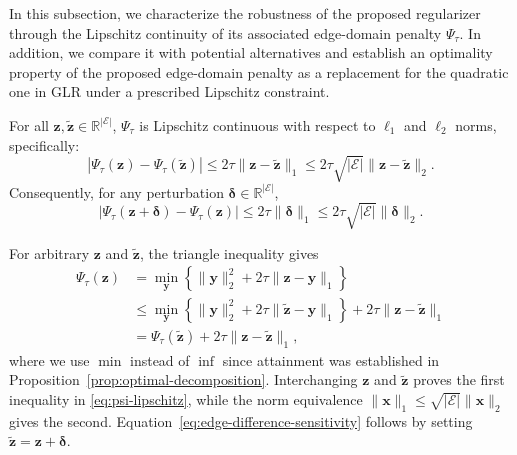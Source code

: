 In this subsection, we characterize the robustness of the proposed regularizer through the Lipschitz continuity of its associated edge-domain penalty $\Psi_{\tau}$.
In addition, we compare it with potential alternatives and establish an optimality property of the proposed edge-domain penalty as a replacement for the quadratic one in GLR under a prescribed Lipschitz constraint.

\begin{proposition}
\label{prop:edge-difference-sensitivity}
For all $\mathbf{z},\widetilde{\mathbf{z}}\in\mathbb{R}^{|\mathcal{E}|}$, $\Psi_{\tau}$ is Lipschitz continuous with respect to $\ell_1$ and $\ell_2$ norms, specifically:
\begin{equation}
\left|
\Psi_{\tau}(\mathbf{z})
-
\Psi_{\tau}(\widetilde{\mathbf{z}})
\right|
\leq
2\tau\|\mathbf{z}-\widetilde{\mathbf{z}}\|_1
\leq
2\tau\sqrt{|\mathcal{E}|}\|\mathbf{z}-\widetilde{\mathbf{z}}\|_2.
\label{eq:psi-lipschitz}
\end{equation}
Consequently, for any perturbation $\boldsymbol{\delta}\in\mathbb{R}^{|\mathcal{E}|}$,
\begin{equation}
\left|
\Psi_{\tau}(\mathbf{z}+\boldsymbol{\delta})
-
\Psi_{\tau}(\mathbf{z})
\right|
\leq
2\tau\|\boldsymbol{\delta}\|_1
\leq
2\tau\sqrt{|\mathcal{E}|}\|\boldsymbol{\delta}\|_2.
\label{eq:edge-difference-sensitivity}
\end{equation}
\end{proposition}

\begin{IEEEproof}
For arbitrary $\mathbf{z}$ and $\widetilde{\mathbf{z}}$, the triangle inequality gives
\begin{align}
\Psi_{\tau}(\mathbf{z})
&=
\min_{\mathbf{y}}
\left\{
\|\mathbf{y}\|_2^2
+
2\tau\|\mathbf{z}-\mathbf{y}\|_1
\right\}
\nonumber
\\
&\leq
\min_{\mathbf{y}}
\left\{
\|\mathbf{y}\|_2^2
+
2\tau\|\widetilde{\mathbf{z}}-\mathbf{y}\|_1
\right\}
+
2\tau\|\mathbf{z}-\widetilde{\mathbf{z}}\|_1
\nonumber
\\
&=
\Psi_{\tau}(\widetilde{\mathbf{z}})
+
2\tau\|\mathbf{z}-\widetilde{\mathbf{z}}\|_1,
\end{align}
where we use $\min$ instead of $\inf$ since attainment was established in Proposition~\ref{prop:optimal-decomposition}.
Interchanging $\mathbf{z}$ and $\widetilde{\mathbf{z}}$ proves the first inequality in \eqref{eq:psi-lipschitz}, while the norm equivalence $\|\mathbf{x}\|_1\leq\sqrt{|\mathcal{E}|}\|\mathbf{x}\|_2$ gives the second.
Equation~\eqref{eq:edge-difference-sensitivity} follows by setting $\widetilde{\mathbf{z}}=\mathbf{z}+\boldsymbol{\delta}$.
\end{IEEEproof}

